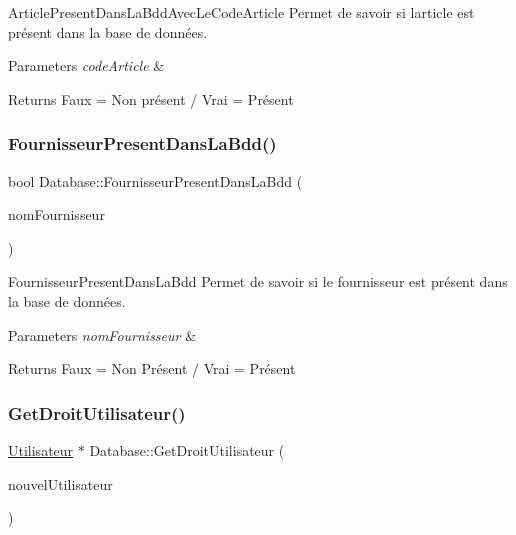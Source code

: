 Article\+Present\+Dans\+La\+Bdd\+Avec\+Le\+Code\+Article Permet de savoir si l\textquotesingle{}article est présent dans la base de données. 


\begin{DoxyParams}{Parameters}
{\em code\+Article} & \\
\hline
\end{DoxyParams}
\begin{DoxyReturn}{Returns}
Faux = Non présent / Vrai = Présent 
\end{DoxyReturn}
\mbox{\label{class_database_a83a103a11c2b982427ffae7eb11ea167}} 
\subsubsection{\texorpdfstring{Fournisseur\+Present\+Dans\+La\+Bdd()}{FournisseurPresentDansLaBdd()}}
{\footnotesize\ttfamily bool Database\+::\+Fournisseur\+Present\+Dans\+La\+Bdd (\begin{DoxyParamCaption}\item[{Q\+String}]{nom\+Fournisseur }\end{DoxyParamCaption})}



Fournisseur\+Present\+Dans\+La\+Bdd Permet de savoir si le fournisseur est présent dans la base de données. 


\begin{DoxyParams}{Parameters}
{\em nom\+Fournisseur} & \\
\hline
\end{DoxyParams}
\begin{DoxyReturn}{Returns}
Faux = Non Présent / Vrai = Présent 
\end{DoxyReturn}
\mbox{\label{class_database_a11db260d702850148645c86c12da3a82}} 
\subsubsection{\texorpdfstring{Get\+Droit\+Utilisateur()}{GetDroitUtilisateur()}}
{\footnotesize\ttfamily \mbox{\hyperlink{class_utilisateur}{Utilisateur}} $\ast$ Database\+::\+Get\+Droit\+Utilisateur (\begin{DoxyParamCaption}\item[{\mbox{\hyperlink{class_utilisateur}{Utilisateur}} $\ast$}]{nouvel\+Utilisateur }\end{DoxyParamCaption})}




